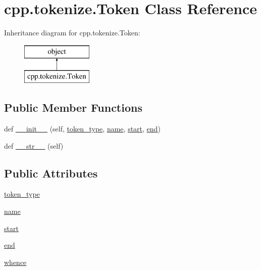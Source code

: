 \hypertarget{classcpp_1_1tokenize_1_1_token}{}\section{cpp.\+tokenize.\+Token Class Reference}
\label{classcpp_1_1tokenize_1_1_token}
Inheritance diagram for cpp.\+tokenize.\+Token\+:\begin{figure}[H]
\begin{center}
\leavevmode
\includegraphics[height=2.000000cm]{dd/d3d/classcpp_1_1tokenize_1_1_token}
\end{center}
\end{figure}
\subsection*{Public Member Functions}
\begin{DoxyCompactItemize}
\item 
def \mbox{\hyperlink{classcpp_1_1tokenize_1_1_token_a7da7659a5a6c61d0f4b8590cf96e19fd}{\+\_\+\+\_\+init\+\_\+\+\_\+}} (self, \mbox{\hyperlink{classcpp_1_1tokenize_1_1_token_a60c6e5120f3947885f10788ceb69a660}{token\+\_\+type}}, \mbox{\hyperlink{classcpp_1_1tokenize_1_1_token_a90859dd16bde71bc38f717f5119e63b9}{name}}, \mbox{\hyperlink{classcpp_1_1tokenize_1_1_token_a8ec48e348ff29901857cb21553da464b}{start}}, \mbox{\hyperlink{classcpp_1_1tokenize_1_1_token_a9935738c382352eca19834c2533715db}{end}})
\item 
def \mbox{\hyperlink{classcpp_1_1tokenize_1_1_token_a98e024051039637a18601fcbb0232cc2}{\+\_\+\+\_\+str\+\_\+\+\_\+}} (self)
\end{DoxyCompactItemize}
\subsection*{Public Attributes}
\begin{DoxyCompactItemize}
\item 
\mbox{\hyperlink{classcpp_1_1tokenize_1_1_token_a60c6e5120f3947885f10788ceb69a660}{token\+\_\+type}}
\item 
\mbox{\hyperlink{classcpp_1_1tokenize_1_1_token_a90859dd16bde71bc38f717f5119e63b9}{name}}
\item 
\mbox{\hyperlink{classcpp_1_1tokenize_1_1_token_a8ec48e348ff29901857cb21553da464b}{start}}
\item 
\mbox{\hyperlink{classcpp_1_1tokenize_1_1_token_a9935738c382352eca19834c2533715db}{end}}
\item 
\mbox{\hyperlink{classcpp_1_1tokenize_1_1_token_a9d3a8011707ede6be85987d74f88848d}{whence}}
\end{DoxyCompactItemize}
